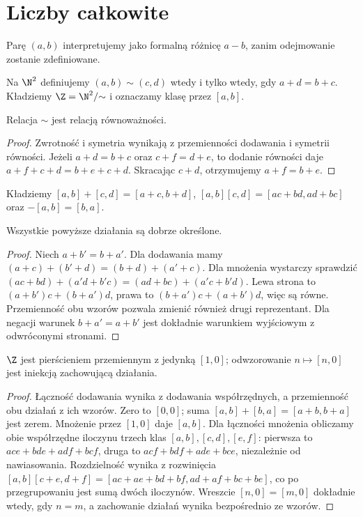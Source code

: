 \section{Liczby całkowite}
\label{ma1:sec:integers}
Parę $(a,b)$ interpretujemy jako formalną różnicę $a-b$, zanim odejmowanie zostanie zdefiniowane.
\begin{definicja}
\label{ma1:def:integer-quotient}
Na $\N^2$ definiujemy $(a,b)\sim(c,d)$ wtedy i tylko wtedy, gdy $a+d=b+c$. Kładziemy $\Z=\N^2/{\sim}$ i oznaczamy klasę przez $[a,b]$.
\end{definicja}
\begin{lemat}
Relacja $\sim$ jest relacją równoważności.
\end{lemat}
\begin{proof}
Zwrotność i symetria wynikają z przemienności dodawania i symetrii równości. Jeżeli $a+d=b+c$ oraz $c+f=d+e$, to dodanie równości daje $a+f+c+d=b+e+c+d$. Skracając $c+d$, otrzymujemy $a+f=b+e$.
\end{proof}
\begin{definicja}
\label{ma1:def:integer-operations}
Kładziemy $[a,b]+[c,d]=[a+c,b+d]$, $[a,b][c,d]=[ac+bd,ad+bc]$ oraz $-[a,b]=[b,a]$.
\end{definicja}
\begin{lemat}
\label{ma1:lem:integer-well-defined}
Wszystkie powyższe działania są dobrze określone.
\end{lemat}
\begin{proof}
Niech $a+b'=b+a'$. Dla dodawania mamy $(a+c)+(b'+d)=(b+d)+(a'+c)$. Dla mnożenia wystarczy sprawdzić
$(ac+bd)+(a'd+b'c)=(ad+bc)+(a'c+b'd)$.
Lewa strona to $(a+b')c+(b+a')d$, prawa to $(b+a')c+(a+b')d$, więc są równe. Przemienność obu wzorów pozwala zmienić również drugi reprezentant. Dla negacji warunek $b+a'=a+b'$ jest dokładnie warunkiem wyjściowym z odwróconymi stronami.
\end{proof}
\begin{twierdzenie}
\label{ma1:thm:integer-ring}
$\Z$ jest pierścieniem przemiennym z jedynką $[1,0]$; odwzorowanie $n\mapsto[n,0]$ jest iniekcją zachowującą działania.
\end{twierdzenie}
\begin{proof}
Łączność dodawania wynika z dodawania współrzędnych, a przemienność obu działań z ich wzorów. Zero to $[0,0]$; suma $[a,b]+[b,a]=[a+b,b+a]$ jest zerem. Mnożenie przez $[1,0]$ daje $[a,b]$. Dla łączności mnożenia obliczamy obie współrzędne iloczynu trzech klas $[a,b],[c,d],[e,f]$: pierwsza to $ace+bde+adf+bcf$, druga to $acf+bdf+ade+bce$, niezależnie od nawiasowania. Rozdzielność wynika z rozwinięcia
$[a,b][c+e,d+f]=[ac+ae+bd+bf,ad+af+bc+be]$,
co po przegrupowaniu jest sumą dwóch iloczynów. Wreszcie $[n,0]=[m,0]$ dokładnie wtedy, gdy $n=m$, a zachowanie działań wynika bezpośrednio ze wzorów.
\end{proof}
